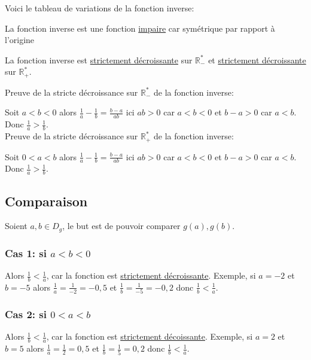 \documentclass[french]{book}
\begin{document}
Voici le tableau de variations de la fonction inverse:
\begin{center}
\end{center}




\begin{prop}
La fonction inverse est une fonction \underline{impaire} car symétrique par rapport à l'origine
\end{prop}

\begin{prop}
La fonction inverse est \underline{strictement décroissante} sur $\mathbb{R}^*_-$ et  \underline{strictement décroissante} sur $\mathbb{R}^*_+$.
\end{prop}

\begin{demo}

Preuve de la stricte décroissance sur $\mathbb{R}^*_-$ de la fonction inverse:


Soit $a<b < 0$ alors $\frac{1}{a} - \frac{1}{b} = \frac{b-a}{ab} $ ici $ab > 0$ car $a<b<0$ et $b-a >0$ car $a<b$. Donc $\frac{1}{a} > \frac{1}{b}$.\\

Preuve de la stricte décroissance sur $\mathbb{R}^*_+$ de la fonction inverse:

Soit $0<a<b$ alors  $\frac{1}{a} - \frac{1}{b} = \frac{b-a}{ab} $ ici $ab > 0$ car $a<b<0$ et $b-a >0$ car $a<b$. Donc $\frac{1}{a} > \frac{1}{b}$.

\end{demo}

\subsection*{Comparaison}
Soient $a,b \in D_g$, le but est de pouvoir comparer $g(a),g(b)$.
\subsubsection*{Cas 1: si $a<b<0$}
Alors $\frac{1}{b} < \frac{1}{a}$, car la fonction est \underline{strictement décroissante}. Exemple, si $a=-2$ et $b=-5$ alors $\frac{1}{a}=\frac{1}{-2}=-0,5$ et $\frac{1}{b}=\frac{1}{-5}=-0,2$ donc $\frac{1}{b} < \frac{1}{a}$.
\subsubsection*{Cas 2: si  $0<a<b$}
Alors $\frac{1}{b}<\frac{1}{a}$, car la fonction est \underline{strictement décoissante}. Exemple, si $a=2$ et $b=5$ alors $\frac{1}{a}=\frac{1}{2}=0,5$ et $\frac{1}{b}=\frac{1}{5}=0,2$ donc $\frac{1}{b} < \frac{1}{a}$.
\end{document}
